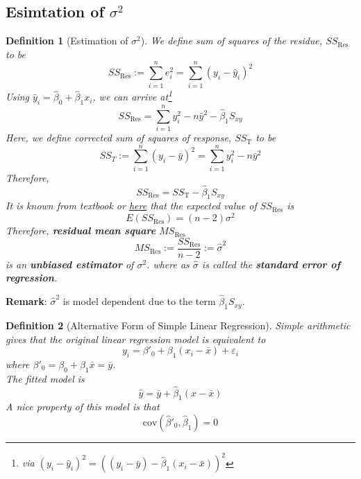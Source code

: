 \documentclass[11pt]{article}
\newcommand{\cov}{\mathrm{cov}}
\newtheorem{definition}{Definition}[section]
\theoremstyle{definition}
\begin{document}
\subsection{Esimtation of {$\sigma^2$}}
\begin{definition}[Estimation of {$\sigma^2$}]
\normalfont We define sum of squares of the residue, $SS_\text{Res}$ to be
\[
SS_\text{Res} := \sum_{i=1}^n e_i^2 = \sum_{i=1}^n (y_i-\hat{y}_i)^2
\]
Using $\hat{y}_i = \hat{\beta}_0 + \hat{\beta}_1 x_i$, we can arrive at\footnote{via $(y_i-\hat{y}_i)^2 = ((y_i-\bar{y}) - \hat{\beta}_1(x_i-\bar{x}))^2$}
\[
SS_\text{Res} = \sum_{i=1}^n y_i^2 - n\bar{y}^2-\hat{\beta}_1 S_{xy}
\]
Here, we define corrected sum of squares of response, $SS_\text{T}$ to be
\[
SS_T := \sum_{i=1}^n (y_i-\bar{y})^2 = \sum_{i=1}^n y_i^2 -n\bar{y}^2
\]
Therefore,
\[
SS_\text{Res} = SS_\text{T} -\hat{\beta}_1S_{xy}
\]
It is known \textit{from textbook} or \href{http://www.mas.ncl.ac.uk/~nag48/teaching/MAS2305/cribsheet2.pdf}{here} that the expected value of $SS_\text{Res}$ is
\[
E(SS_\text{Res}) = (n-2)\sigma^2
\]
Therefore, \textbf{residual mean square} $MS_\text{Res}$ 
\[
MS_\text{Res}:=\frac{SS_\text{Res}}{n-2}:=\hat{\sigma}^2
\]
is an \textbf{unbiased estimator} of $\sigma^2$. where as $\hat{\sigma}$ is called the \textbf{standard error of regression}.
\end{definition}
\textbf{Remark}: $\hat{\sigma}^2$ is model dependent due to the term $\hat{\beta}_1 S_{xy}$.
\begin{definition}[Alternative Form of Simple Linear Regression]
\normalfont Simple arithmetic gives that the original linear regression model is equivalent to
\[
y_i = \beta'_0+\beta_1(x_i-\bar{x})+\varepsilon_i
\]
where $\beta'_0 = \beta_0+\beta_1\bar{x} = \bar{y}$.\\
The fitted model is
\[
\hat{y} = \bar{y}+\hat{\beta}_1(x-\bar{x})
\]
A nice property of this model is that 
\[
\cov(\hat{\beta}'_0, \hat{\beta}_1) = 0
\]
\end{definition}
\end{document}
